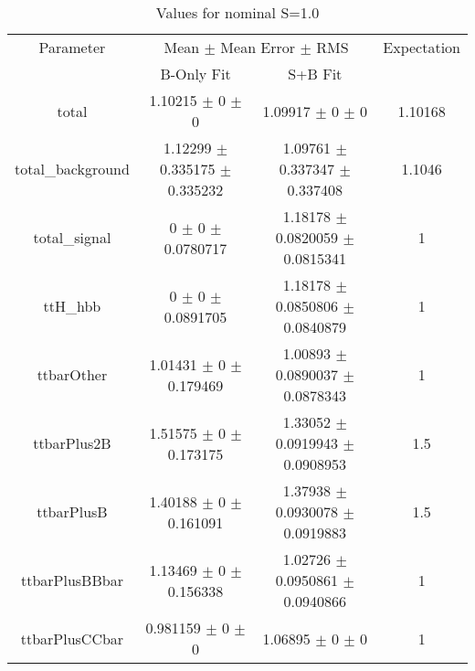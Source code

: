 \begin{table}
\centering
\caption{Values for nominal S=1.0}
\begin{tabular}{cccc}
\toprule
Parameter & \multicolumn{2}{c}{Mean $\pm$ Mean Error $\pm$ RMS} & Expectation\\
 & B-Only Fit & S+B Fit & \\
\midrule
total & \num{1.10215} $\pm$ \num{0} $\pm$ \num{0} & \num{1.09917} $\pm$ \num{0} $\pm$ \num{0} & \num{1.10168}\\
total\_background & \num{1.12299} $\pm$ \num{0.335175} $\pm$ \num{0.335232} & \num{1.09761} $\pm$ \num{0.337347} $\pm$ \num{0.337408} & \num{1.1046}\\
total\_signal & \num{0} $\pm$ \num{0} $\pm$ \num{0.0780717} & \num{1.18178} $\pm$ \num{0.0820059} $\pm$ \num{0.0815341} & \num{1}\\
ttH\_hbb & \num{0} $\pm$ \num{0} $\pm$ \num{0.0891705} & \num{1.18178} $\pm$ \num{0.0850806} $\pm$ \num{0.0840879} & \num{1}\\
ttbarOther & \num{1.01431} $\pm$ \num{0} $\pm$ \num{0.179469} & \num{1.00893} $\pm$ \num{0.0890037} $\pm$ \num{0.0878343} & \num{1}\\
ttbarPlus2B & \num{1.51575} $\pm$ \num{0} $\pm$ \num{0.173175} & \num{1.33052} $\pm$ \num{0.0919943} $\pm$ \num{0.0908953} & \num{1.5}\\
ttbarPlusB & \num{1.40188} $\pm$ \num{0} $\pm$ \num{0.161091} & \num{1.37938} $\pm$ \num{0.0930078} $\pm$ \num{0.0919883} & \num{1.5}\\
ttbarPlusBBbar & \num{1.13469} $\pm$ \num{0} $\pm$ \num{0.156338} & \num{1.02726} $\pm$ \num{0.0950861} $\pm$ \num{0.0940866} & \num{1}\\
ttbarPlusCCbar & \num{0.981159} $\pm$ \num{0} $\pm$ \num{0} & \num{1.06895} $\pm$ \num{0} $\pm$ \num{0} & \num{1}\\
\bottomrule
\end{tabular}
\end{table}